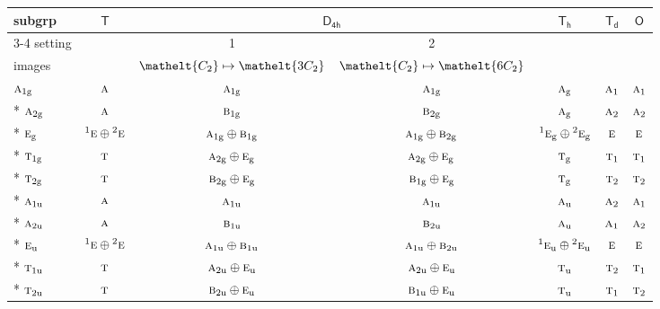 \documentclass[10pt,a4paper]{article}
\numberwithin{equation}{section}
\newcommand{\eltfont}[1]{{\let\sigma\eltsigma\mathelt{#1}}}
\newcommand{\grp}[1]{\mathsf{#1}}
\newcommand{\irr}[1]{\text{\normalfont\scshape #1}}
\newcommand{\conjpair}[1]{{}^{#1}}
\newcommand{\cls}[1]{\eltfont{#1}}
\newcommand{\ptag}[1]{\mathrm{#1}}
\begin{document}
{\small\begin{longtable}{@{}lcccccc@{}}\toprule
subgrp & \href{T.pdf}{$\grp{T}$} & \multicolumn{2}{c}{\href{D4h.pdf}{$\grp{D_{4h}}$}} & \href{Th.pdf}{$\grp{T_{h}}$} & \href{Td.pdf}{$\grp{T_{d}}$} & \href{O.pdf}{$\grp{O}$}\\\cmidrule(lr){3-4}
setting &  & 1 & 2 &  &  & \\
images &  & {\scriptsize $\cls{C_{2}} \mapsto \cls{3C_{2}}$} & {\scriptsize $\cls{C_{2}} \mapsto \cls{6C_{2}}$} &  &  & \\\midrule\endhead
\bottomrule\endfoot\endlastfoot
$\irr{a}_{1\ptag{g}}$ & $\irr{a}$ & $\irr{a}_{1\ptag{g}}$ & $\irr{a}_{1\ptag{g}}$ & $\irr{a}_{\ptag{g}}$ & $\irr{a}_{1}$ & $\irr{a}_{1}$\\*
$\irr{a}_{2\ptag{g}}$ & $\irr{a}$ & $\irr{b}_{1\ptag{g}}$ & $\irr{b}_{2\ptag{g}}$ & $\irr{a}_{\ptag{g}}$ & $\irr{a}_{2}$ & $\irr{a}_{2}$\\*
$\irr{e}_{\ptag{g}}$ & $\conjpair{1}\irr{e}\oplus \conjpair{2}\irr{e}$ & $\irr{a}_{1\ptag{g}}\oplus \irr{b}_{1\ptag{g}}$ & $\irr{a}_{1\ptag{g}}\oplus \irr{b}_{2\ptag{g}}$ & $\conjpair{1}\irr{e}_{\ptag{g}}\oplus \conjpair{2}\irr{e}_{\ptag{g}}$ & $\irr{e}$ & $\irr{e}$\\*
$\irr{t}_{1\ptag{g}}$ & $\irr{t}$ & $\irr{a}_{2\ptag{g}}\oplus \irr{e}_{\ptag{g}}$ & $\irr{a}_{2\ptag{g}}\oplus \irr{e}_{\ptag{g}}$ & $\irr{t}_{\ptag{g}}$ & $\irr{t}_{1}$ & $\irr{t}_{1}$\\*
$\irr{t}_{2\ptag{g}}$ & $\irr{t}$ & $\irr{b}_{2\ptag{g}}\oplus \irr{e}_{\ptag{g}}$ & $\irr{b}_{1\ptag{g}}\oplus \irr{e}_{\ptag{g}}$ & $\irr{t}_{\ptag{g}}$ & $\irr{t}_{2}$ & $\irr{t}_{2}$\\*
$\irr{a}_{1\ptag{u}}$ & $\irr{a}$ & $\irr{a}_{1\ptag{u}}$ & $\irr{a}_{1\ptag{u}}$ & $\irr{a}_{\ptag{u}}$ & $\irr{a}_{2}$ & $\irr{a}_{1}$\\*
$\irr{a}_{2\ptag{u}}$ & $\irr{a}$ & $\irr{b}_{1\ptag{u}}$ & $\irr{b}_{2\ptag{u}}$ & $\irr{a}_{\ptag{u}}$ & $\irr{a}_{1}$ & $\irr{a}_{2}$\\*
$\irr{e}_{\ptag{u}}$ & $\conjpair{1}\irr{e}\oplus \conjpair{2}\irr{e}$ & $\irr{a}_{1\ptag{u}}\oplus \irr{b}_{1\ptag{u}}$ & $\irr{a}_{1\ptag{u}}\oplus \irr{b}_{2\ptag{u}}$ & $\conjpair{1}\irr{e}_{\ptag{u}}\oplus \conjpair{2}\irr{e}_{\ptag{u}}$ & $\irr{e}$ & $\irr{e}$\\*
$\irr{t}_{1\ptag{u}}$ & $\irr{t}$ & $\irr{a}_{2\ptag{u}}\oplus \irr{e}_{\ptag{u}}$ & $\irr{a}_{2\ptag{u}}\oplus \irr{e}_{\ptag{u}}$ & $\irr{t}_{\ptag{u}}$ & $\irr{t}_{2}$ & $\irr{t}_{1}$\\*
$\irr{t}_{2\ptag{u}}$ & $\irr{t}$ & $\irr{b}_{2\ptag{u}}\oplus \irr{e}_{\ptag{u}}$ & $\irr{b}_{1\ptag{u}}\oplus \irr{e}_{\ptag{u}}$ & $\irr{t}_{\ptag{u}}$ & $\irr{t}_{1}$ & $\irr{t}_{2}$\\
\bottomrule\end{longtable}}
\end{document}
